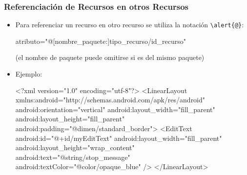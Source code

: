 \documentclass[hyperref={pdfpagelabels=true},ucs]{beamer}
\begin{document}
\begin{frame}[fragile,shrink=5]
\frametitle{Referenciación de Recursos en otros Recursos}

\begin{itemize}
\item Para referenciar un recurso en otro recurso se utiliza la
  notación \Verb|\alert{@}|:
\begin{tiny}
\begin{block}{}
\begin{xml}
atributo="@[nombre_paquete:]tipo_recurso/id_recurso"
\end{xml}
\end{block}
\end{tiny}
(el nombre de paquete puede omitirse si es del mismo paquete)

\item Ejemplo:

\begin{tiny}
\begin{block}{}
\begin{xml}
<?xml version="1.0" encoding="utf-8"?>
<LinearLayout
  xmlns:android="http://schemas.android.com/apk/res/android"
  android:orientation="vertical"
  android:layout_width="fill_parent"
  android:layout_height="fill_parent"
  android:padding="@dimen/standard_border">
  <EditText
     android:id="@+id/myEditText"
     android:layout_width="fill_parent"
     android:layout_height="wrap_content"
     android:text="@string/stop_message"
     android:textColor="@color/opaque_blue"
  />
</LinearLayout>
\end{xml}
\end{block}
\end{tiny}


\end{itemize}



\end{frame}
\end{document}
